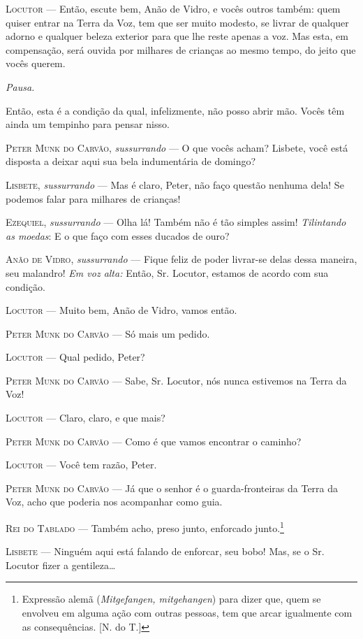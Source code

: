 \textsc{Locutor} --- Então, escute bem, Anão de Vidro, e vocês outros também: quem
quiser entrar na Terra da Voz, tem que ser muito modesto, se livrar de
qualquer adorno e qualquer beleza exterior para que lhe reste apenas a
voz. Mas esta, em compensação, será ouvida por milhares de crianças ao
mesmo tempo, do jeito que vocês querem.

\emph{Pausa.}

Então, esta é a condição da qual, infelizmente, não posso abrir mão.
Vocês têm ainda um tempinho para pensar nisso.

\textsc{Peter Munk do Carvão}, \emph{sussurrando} --- O que vocês acham? Lisbete,
você está disposta a deixar aqui sua bela indumentária de domingo?

\textsc{Lisbete}, \emph{sussurrando} --- Mas é claro, Peter, não faço questão
nenhuma dela! Se podemos falar para milhares de crianças!

\textsc{Ezequiel}, \emph{sussurrando} --- Olha lá! Também não é tão simples assim!
\emph{Tilintando as moedas}: E o que faço com esses ducados de ouro?

\textsc{Anão de Vidro}, \emph{sussurrando} --- Fique feliz de poder livrar-se
delas dessa maneira, seu malandro! \emph{Em voz alta:} Então, Sr.
Locutor, estamos de acordo com sua condição.

\textsc{Locutor} --- Muito bem, Anão de Vidro, vamos então.

\textsc{Peter Munk do Carvão} --- Só mais um pedido.

\textsc{Locutor} --- Qual pedido, Peter?

\textsc{Peter Munk do Carvão} --- Sabe, Sr. Locutor, nós nunca estivemos na Terra
da Voz!

\textsc{Locutor} --- Claro, claro, e que mais?

\textsc{Peter Munk do Carvão} --- Como é que vamos encontrar o caminho?

\textsc{Locutor} --- Você tem razão, Peter.

\textsc{Peter Munk do Carvão} --- Já que o senhor é o guarda-fronteiras da Terra
da Voz, acho que poderia nos acompanhar como guia.

\textsc{Rei do Tablado} --- Também acho, preso junto, enforcado junto.\footnote{Expressão
  alemã (\emph{Mitgefangen, mitgehangen}) para dizer que, quem se
  envolveu em alguma ação com outras pessoas, tem que arcar igualmente
  com as consequências. [N. do T.]}

\textsc{Lisbete} --- Ninguém aqui está falando de enforcar, seu bobo! Mas, se o
Sr. Locutor fizer a gentileza\ldots{}

